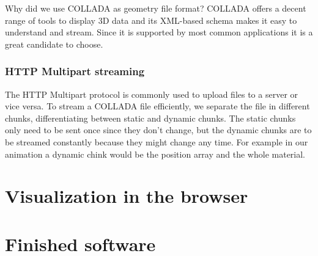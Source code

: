\documentclass[%
aip,
jmp,
amsmath,amssymb,
reprint,
nofootinbib
]{revtex4-1}
\begin{document}
	Why did we use COLLADA as geometry file format? COLLADA offers a decent range of tools to display 3D data and its XML-based schema makes it easy to understand and stream. Since it is supported by most common applications it is a great candidate to choose.
	
	\subsubsection{HTTP Multipart streaming}
	The HTTP Multipart protocol is commonly used to upload files to a server or vice versa. To stream a COLLADA file efficiently, we separate the file in different chunks, differentiating between static and dynamic chunks. The static chunks only need to be sent once since they don't change, but the dynamic chunks are to be streamed constantly because they might change any time. For example in our animation a dynamic chink would be the position array and the whole material.
	
	\section{Visualization in the browser}
	
	\section{Finished software}
	
	
\end{document}
